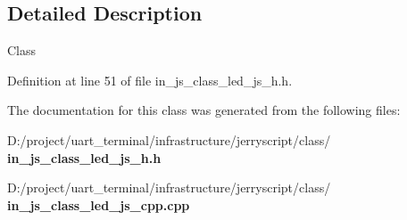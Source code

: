 \subsection{Detailed Description}
Class 

Definition at line 51 of file in\+\_\+js\+\_\+class\+\_\+led\+\_\+js\+\_\+h.\+h.



The documentation for this class was generated from the following files\+:\begin{DoxyCompactItemize}
\item 
D\+:/project/uart\+\_\+terminal/infrastructure/jerryscript/class/\textbf{ in\+\_\+js\+\_\+class\+\_\+led\+\_\+js\+\_\+h.\+h}\item 
D\+:/project/uart\+\_\+terminal/infrastructure/jerryscript/class/\textbf{ in\+\_\+js\+\_\+class\+\_\+led\+\_\+js\+\_\+cpp.\+cpp}\end{DoxyCompactItemize}
